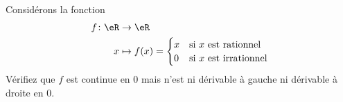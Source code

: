 
\begin{exercice}\label{exo0040}

Considérons la fonction
\begin{equation}
	\begin{aligned}
		f\colon \eR&\to \eR \\
		x&\mapsto f(x)=\begin{cases}
	x	&	\text{si $x$ est rationnel}\\
	0	&	 \text{si $x$ est irrationnel}
\end{cases}
	\end{aligned}
\end{equation}
Vérifiez que $f$ est continue en $0$ mais n'est ni dérivable à  gauche ni dérivable à droite en $0$.

\end{exercice}
